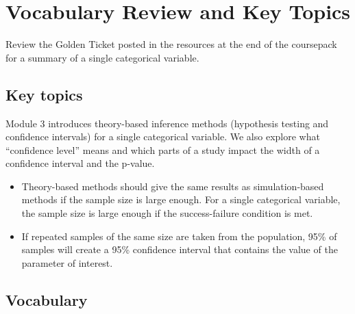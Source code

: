 \documentclass[
]{report}
\begin{document}
\section{Vocabulary Review and Key Topics}\label{vocabulary-review-and-key-topics-3}

Review the Golden Ticket posted in the resources at the end of the coursepack for a summary of a single categorical variable.

\subsection{Key topics}\label{key-topics-3}

Module 3 introduces theory-based inference methods (hypothesis testing and confidence intervals) for a single categorical variable. We also explore what ``confidence level'' means and which parts of a study impact the width of a confidence interval and the p-value.

\begin{itemize}
\item
  Theory-based methods should give the same results as simulation-based methods if the sample size is large enough. For a single categorical variable, the sample size is large enough if the success-failure condition is met.
\item
  If repeated samples of the same size are taken from the population, 95\% of samples will create a 95\% confidence interval that contains the value of the parameter of interest.
\end{itemize}

\subsection{Vocabulary}\label{vocabulary-3}
\end{document}
